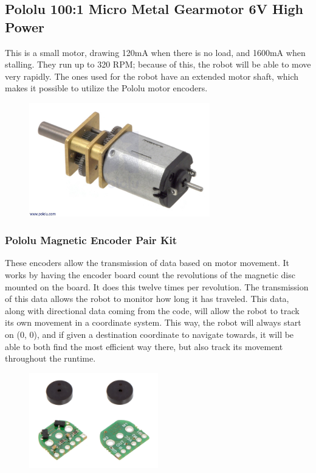 \subsection{Pololu 100:1 Micro Metal Gearmotor 6V High Power}

This is a small motor, drawing 120mA when there is no load, and 1600mA when stalling. They run up to 320 RPM; because of this, the robot will be able to move very rapidly. The ones used for the robot have an extended motor shaft, which makes it possible to utilize the Pololu motor encoders.

\begin{figure}[!ht]
	\centering
	\includegraphics[width=0.7\textwidth]{figures/pololu.jpg}
	\caption{}
	\label{Hardware diagram}
\end{figure}

\subsubsection{Pololu Magnetic Encoder Pair Kit}

These encoders allow the transmission of data based on motor movement. It works by having the encoder board count the revolutions of the magnetic disc mounted on the board. It does this twelve times per revolution. The transmission of this data allows the robot to monitor how long it has traveled. This data, along with directional data coming from the code, will allow the robot to track its own movement in a coordinate system. This way, the robot will always start on (0, 0), and if given a destination coordinate to navigate towards, it will be able to both find the most efficient way there, but also track its movement throughout the runtime.

\begin{figure}[!ht]
	\centering
	\includegraphics[width=0.5\textwidth]{figures/pololuEncoder.jpg}
	\caption{}
	\label{Hardware diagram}
\end{figure}
\newpage
